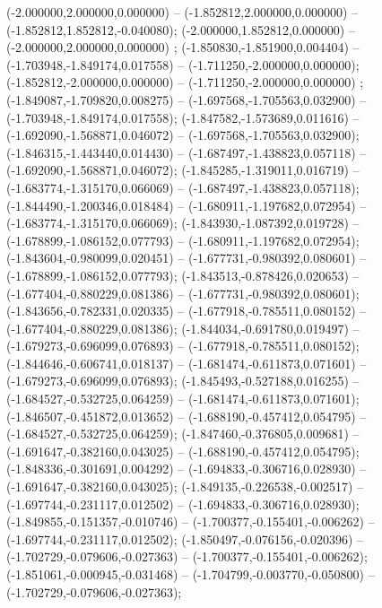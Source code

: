  (-2.000000,2.000000,0.000000) -- (-1.852812,2.000000,0.000000) -- (-1.852812,1.852812,-0.040080);
 (-2.000000,1.852812,0.000000) -- (-2.000000,2.000000,0.000000) ;
 (-1.850830,-1.851900,0.004404) -- (-1.703948,-1.849174,0.017558) -- (-1.711250,-2.000000,0.000000);
 (-1.852812,-2.000000,0.000000) -- (-1.711250,-2.000000,0.000000) ;
 (-1.849087,-1.709820,0.008275) -- (-1.697568,-1.705563,0.032900) -- (-1.703948,-1.849174,0.017558);
 (-1.847582,-1.573689,0.011616) -- (-1.692090,-1.568871,0.046072) -- (-1.697568,-1.705563,0.032900);
 (-1.846315,-1.443440,0.014430) -- (-1.687497,-1.438823,0.057118) -- (-1.692090,-1.568871,0.046072);
 (-1.845285,-1.319011,0.016719) -- (-1.683774,-1.315170,0.066069) -- (-1.687497,-1.438823,0.057118);
 (-1.844490,-1.200346,0.018484) -- (-1.680911,-1.197682,0.072954) -- (-1.683774,-1.315170,0.066069);
 (-1.843930,-1.087392,0.019728) -- (-1.678899,-1.086152,0.077793) -- (-1.680911,-1.197682,0.072954);
 (-1.843604,-0.980099,0.020451) -- (-1.677731,-0.980392,0.080601) -- (-1.678899,-1.086152,0.077793);
 (-1.843513,-0.878426,0.020653) -- (-1.677404,-0.880229,0.081386) -- (-1.677731,-0.980392,0.080601);
 (-1.843656,-0.782331,0.020335) -- (-1.677918,-0.785511,0.080152) -- (-1.677404,-0.880229,0.081386);
 (-1.844034,-0.691780,0.019497) -- (-1.679273,-0.696099,0.076893) -- (-1.677918,-0.785511,0.080152);
 (-1.844646,-0.606741,0.018137) -- (-1.681474,-0.611873,0.071601) -- (-1.679273,-0.696099,0.076893);
 (-1.845493,-0.527188,0.016255) -- (-1.684527,-0.532725,0.064259) -- (-1.681474,-0.611873,0.071601);
 (-1.846507,-0.451872,0.013652) -- (-1.688190,-0.457412,0.054795) -- (-1.684527,-0.532725,0.064259);
 (-1.847460,-0.376805,0.009681) -- (-1.691647,-0.382160,0.043025) -- (-1.688190,-0.457412,0.054795);
 (-1.848336,-0.301691,0.004292) -- (-1.694833,-0.306716,0.028930) -- (-1.691647,-0.382160,0.043025);
 (-1.849135,-0.226538,-0.002517) -- (-1.697744,-0.231117,0.012502) -- (-1.694833,-0.306716,0.028930);
 (-1.849855,-0.151357,-0.010746) -- (-1.700377,-0.155401,-0.006262) -- (-1.697744,-0.231117,0.012502);
 (-1.850497,-0.076156,-0.020396) -- (-1.702729,-0.079606,-0.027363) -- (-1.700377,-0.155401,-0.006262);
 (-1.851061,-0.000945,-0.031468) -- (-1.704799,-0.003770,-0.050800) -- (-1.702729,-0.079606,-0.027363);
